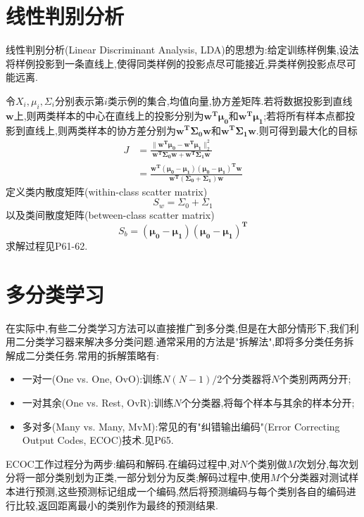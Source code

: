 \section{线性判别分析}

线性判别分析(Linear Discriminant Analysis, LDA)的思想为:给定训练样例集,设法将样例投影到一条直线上,使得同类样例的投影点尽可能接近,异类样例投影点尽可能远离.

令$X_i,\mu_i,\Sigma_i$分别表示第$i$类示例的集合,均值向量,协方差矩阵.若将数据投影到直线$\mathbf w$上,则两类样本的中心在直线上的投影分别为$\mathbf{w^T\mu_0}$和$\mathbf{w^T\mu_1}$;若将所有样本点都投影到直线上,则两类样本的协方差分别为$\mathbf{w^T\Sigma_0w}$和$\mathbf{w^T\Sigma_1w}$.则可得到最大化的目标
\begin{equation}\begin{split}
J&=\frac{\|\mathbf{w^T\mu_0-w^T\mu_1}\|_2^2}{\mathbf{w^T\Sigma_0w+w^T\Sigma_1w}}\\
&=\frac{\mathbf{w^T(\mu_0-\mu_1)(\mu_0-\mu_1)^Tw}}{\mathbf{w^T(\Sigma_0+\Sigma_1)w}}
\end{split}\end{equation}
定义类内散度矩阵(within-class scatter matrix)
\begin{equation}
S_w=\Sigma_0+\Sigma_1
\end{equation}
以及类间散度矩阵(between-class scatter matrix)
\begin{equation}
S_b=\mathbf{(\mu_0-\mu_1)(\mu_0-\mu_1)^T}
\end{equation}
求解过程见P61-62.

\section{多分类学习}

在实际中,有些二分类学习方法可以直接推广到多分类,但是在大部分情形下,我们利用二分类学习器来解决多分类问题.通常采用的方法是"拆解法",即将多分类任务拆解成二分类任务.常用的拆解策略有:
\begin{itemize}
\item 一对一(One vs. One, OvO):训练$N(N-1)/2$个分类器将$N$个类别两两分开;
\item 一对其余(One vs. Rest, OvR):训练$N$个分类器,将每个样本与其余的样本分开;
\item 多对多(Many vs. Many, MvM):常见的有"纠错输出编码"(Error Correcting Output Codes, ECOC)技术.见P65.
\end{itemize}

ECOC工作过程分为两步:编码和解码.在编码过程中,对$N$个类别做$M$次划分,每次划分将一部分类别划为正类,一部分划分为反类;解码过程中,使用$M$个分类器对测试样本进行预测,这些预测标记组成一个编码,然后将预测编码与每个类别各自的编码进行比较,返回距离最小的类别作为最终的预测结果.

